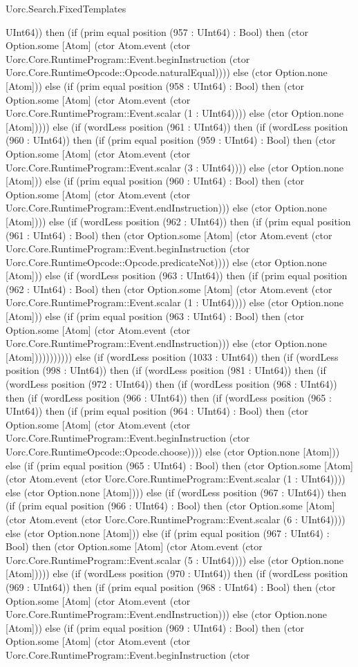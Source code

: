 \begin{lexlean}{Uorc.Search.FixedTemplates}
\begin{semanticmodule}
{UInt64)) then (if (prim equal position (957 : UInt64) : Bool) then (ctor Option.some [Atom] (ctor Atom.event (ctor Uorc.Core.RuntimeProgram::Event.beginInstruction (ctor Uorc.Core.RuntimeOpcode::Opcode.naturalEqual)))) else (ctor Option.none [Atom])) else (if (prim equal position (958 : UInt64) : Bool) then (ctor Option.some [Atom] (ctor Atom.event (ctor Uorc.Core.RuntimeProgram::Event.scalar (1 : UInt64)))) else (ctor Option.none [Atom])))) else (if (wordLess position (961 : UInt64)) then (if (wordLess position (960 : UInt64)) then (if (prim equal position (959 : UInt64) : Bool) then (ctor Option.some [Atom] (ctor Atom.event (ctor Uorc.Core.RuntimeProgram::Event.scalar (3 : UInt64)))) else (ctor Option.none [Atom])) else (if (prim equal position (960 : UInt64) : Bool) then (ctor Option.some [Atom] (ctor Atom.event (ctor Uorc.Core.RuntimeProgram::Event.endInstruction))) else (ctor Option.none [Atom]))) else (if (wordLess position (962 : UInt64)) then (if (prim equal position (961 : UInt64) : Bool) then (ctor Option.some [Atom] (ctor Atom.event (ctor Uorc.Core.RuntimeProgram::Event.beginInstruction (ctor Uorc.Core.RuntimeOpcode::Opcode.predicateNot)))) else (ctor Option.none [Atom])) else (if (wordLess position (963 : UInt64)) then (if (prim equal position (962 : UInt64) : Bool) then (ctor Option.some [Atom] (ctor Atom.event (ctor Uorc.Core.RuntimeProgram::Event.scalar (1 : UInt64)))) else (ctor Option.none [Atom])) else (if (prim equal position (963 : UInt64) : Bool) then (ctor Option.some [Atom] (ctor Atom.event (ctor Uorc.Core.RuntimeProgram::Event.endInstruction))) else (ctor Option.none [Atom])))))))))) else (if (wordLess position (1033 : UInt64)) then (if (wordLess position (998 : UInt64)) then (if (wordLess position (981 : UInt64)) then (if (wordLess position (972 : UInt64)) then (if (wordLess position (968 : UInt64)) then (if (wordLess position (966 : UInt64)) then (if (wordLess position (965 : UInt64)) then (if (prim equal position (964 : UInt64) : Bool) then (ctor Option.some [Atom] (ctor Atom.event (ctor Uorc.Core.RuntimeProgram::Event.beginInstruction (ctor Uorc.Core.RuntimeOpcode::Opcode.choose)))) else (ctor Option.none [Atom])) else (if (prim equal position (965 : UInt64) : Bool) then (ctor Option.some [Atom] (ctor Atom.event (ctor Uorc.Core.RuntimeProgram::Event.scalar (1 : UInt64)))) else (ctor Option.none [Atom]))) else (if (wordLess position (967 : UInt64)) then (if (prim equal position (966 : UInt64) : Bool) then (ctor Option.some [Atom] (ctor Atom.event (ctor Uorc.Core.RuntimeProgram::Event.scalar (6 : UInt64)))) else (ctor Option.none [Atom])) else (if (prim equal position (967 : UInt64) : Bool) then (ctor Option.some [Atom] (ctor Atom.event (ctor Uorc.Core.RuntimeProgram::Event.scalar (5 : UInt64)))) else (ctor Option.none [Atom])))) else (if (wordLess position (970 : UInt64)) then (if (wordLess position (969 : UInt64)) then (if (prim equal position (968 : UInt64) : Bool) then (ctor Option.some [Atom] (ctor Atom.event (ctor Uorc.Core.RuntimeProgram::Event.endInstruction))) else (ctor Option.none [Atom])) else (if (prim equal position (969 : UInt64) : Bool) then (ctor Option.some [Atom] (ctor Atom.event (ctor Uorc.Core.RuntimeProgram::Event.beginInstruction (ctor }
\end{semanticmodule}
\end{lexlean}
